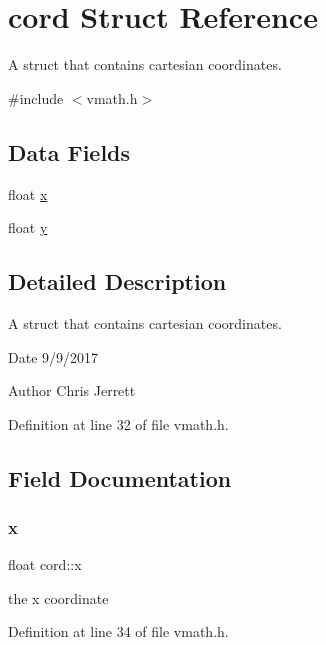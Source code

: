 \hypertarget{structcord}{}\section{cord Struct Reference}
\label{structcord}


A struct that contains cartesian coordinates.  




{\ttfamily \#include $<$vmath.\+h$>$}

\subsection*{Data Fields}
\begin{DoxyCompactItemize}
\item 
float \hyperlink{structcord_a2eef9b681474b679cf87b0c20eced2cd}{x}
\item 
float \hyperlink{structcord_a4e7d289c55cfe511532e53a81dc19215}{y}
\end{DoxyCompactItemize}


\subsection{Detailed Description}
A struct that contains cartesian coordinates. 

\begin{DoxyDate}{Date}
9/9/2017 
\end{DoxyDate}
\begin{DoxyAuthor}{Author}
Chris Jerrett 
\end{DoxyAuthor}


Definition at line 32 of file vmath.\+h.



\subsection{Field Documentation}
\mbox{\label{structcord_a2eef9b681474b679cf87b0c20eced2cd}} 
\subsubsection{\texorpdfstring{x}{x}}
{\footnotesize\ttfamily float cord\+::x}

the x coordinate 

Definition at line 34 of file vmath.\+h.



